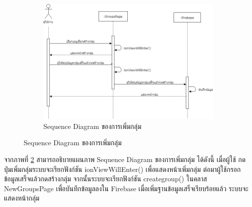 \begin{figure}
	\begin{figure}[H]
		\centering
		\includegraphics[width=0.8\columnwidth]
		{Figures/3/Sequence/addgroup}
		\caption{Sequence Diagram ของการเพิ่มกลุ่ม}
		\label{Fig:Sequence-addgroup}
	\end{figure}
\end{figure}
	จากภาพที่ \ref{Fig:Sequence-addgroup} สามารถอธิบายแผนภาพ Sequence Diagram ของการเพิ่มกลุ่ม ได้ดังนี้ เมื่อผู้ใช้
	กดปุ่มเพิ่มกลุ่มระบบจะเรียกฟังก์ชัน ionViewWillEnter() เพื่อแสดงหน้าเพิ่มกลุ่ม ต่อมาผู้ใช้กรอกข้อมูลเสร็จแล้วกดสร้างกลุ่ม 
	จากนั้นระบบจะเรียกฟังก์ชัน creategroup() ในคลาส NewGroupsPage เพื่อบันทึกข้อมูลลงใน Firebase เมื่อเพิ่มฐานข้อมูลเสร็จเรียบร้อยแล้ว 
	ระบบจะแสดงหน้ากลุ่ม
	\newpage	

